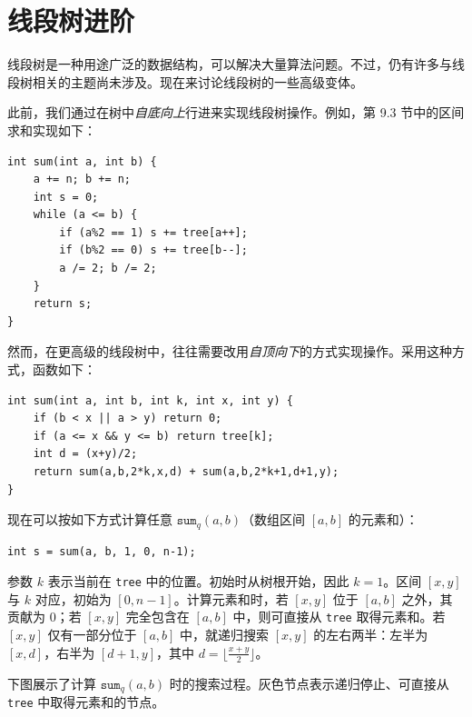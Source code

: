 \chapter{线段树进阶}


线段树是一种用途广泛的数据结构，可以解决大量算法问题。不过，仍有许多与线段树相关的主题尚未涉及。现在来讨论线段树的一些高级变体。

此前，我们通过在树中\emph{自底向上}行进来实现线段树操作。例如，第 9.3 节中的区间求和实现如下：

\begin{lstlisting}
int sum(int a, int b) {
    a += n; b += n;
    int s = 0;
    while (a <= b) {
        if (a%2 == 1) s += tree[a++];
        if (b%2 == 0) s += tree[b--];
        a /= 2; b /= 2;
    }
    return s;
}
\end{lstlisting}

然而，在更高级的线段树中，往往需要改用\emph{自顶向下}的方式实现操作。采用这种方式，函数如下：
\begin{lstlisting}
int sum(int a, int b, int k, int x, int y) {
    if (b < x || a > y) return 0;
    if (a <= x && y <= b) return tree[k];
    int d = (x+y)/2;
    return sum(a,b,2*k,x,d) + sum(a,b,2*k+1,d+1,y);
}
\end{lstlisting}

现在可以按如下方式计算任意 $\texttt{sum}_q(a,b)$（数组区间 $[a,b]$ 的元素和）：
\begin{lstlisting}
int s = sum(a, b, 1, 0, n-1);
\end{lstlisting}

参数 $k$ 表示当前在 \texttt{tree} 中的位置。初始时从树根开始，因此 $k=1$。区间 $[x,y]$ 与 $k$ 对应，初始为 $[0,n-1]$。计算元素和时，若 $[x,y]$ 位于 $[a,b]$ 之外，其贡献为 0；若 $[x,y]$ 完全包含在 $[a,b]$ 中，则可直接从 \texttt{tree} 取得元素和。若 $[x,y]$ 仅有一部分位于 $[a,b]$ 中，就递归搜索 $[x,y]$ 的左右两半：左半为 $[x,d]$，右半为 $[d+1,y]$，其中 $d=\lfloor \frac{x+y}{2} \rfloor$。

下图展示了计算 $\texttt{sum}_q(a,b)$ 时的搜索过程。灰色节点表示递归停止、可直接从 \texttt{tree} 中取得元素和的节点。

